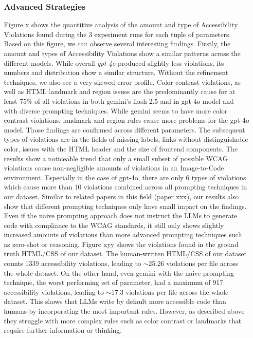 \subsubsection{Advanced Strategies}
Figure x shows the quantitive analysis of the amount and type of Accessibility 
Violations found during the 3 experiment runs for each tuple of parameters.
Based on this figure, we can observe several interesting findings.\newline
Firstly, the amount and types of Accessibility Violations show a similar 
patterns across the different models. While overall \textit{gpt-4o} produced
slightly less violations, its numbers and distribution show a similar 
structure. 
Without the refinement techniques, we also see a very skewed error profile. 
Color contrast violations, as well as HTML landmark and region 
issues are the predominantly cause for at least 75\% of all violations in both
gemini's flash-2.5 and in gpt-4o model and with diverse prompting techniques.\newline
While gemini seems to have more color contrast violations, 
landmark and region rules cause more problems for the gpt-4o model. Those 
findings are confirmed across different parameters.\newline
The subsequent types of violations are in the fields of missing labels,
links without distinguishable color, issues with the HTML header and 
the size of frontend components. The results show a noticeable trend that 
only a small subset of possible WCAG violations cause non-negligible amounts 
of violations in an Image-to-Code environment. Especially in the case of 
gpt-4o, there are only 6 types of violations which cause more than 10
violations combined across all prompting techniques in our dataset.\newline
Similar to related papers in this field (paper xxx), our results also show 
that different prompting techniques only have small impact on the findings.
Even if the naive prompting approach does not instruct the LLMs to generate
code with compliance to the WCAG standards, it still only shows slightly 
increased amounts of violations than more advanced prompting techniques such as 
zero-shot or reasoning.\newline
Figure xyy shows the violations found in the ground truth HTML/CSS of our 
dataset. The human-written HTML/CSS of our dataset counts 1339 accessibility 
violations, leading to $\sim$25.26 violations per file across the whole dataset.
On the other hand, even gemini with the naive prompting technique,
the worst performing set of parameter, had a maximum of 917 accessibility 
violations, leading to $\sim$17.3 violations per file across the whole dataset.
This shows that LLMs write by default more accessible code than humans by 
incorporating the most important rules. However, as described above they 
struggle with more complex rules such as color contrast or landmarks
that require further information or thinking.


